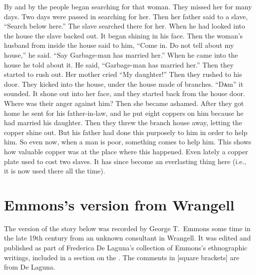 By and by the people began searching for that woman.
They missed her for many days.
Two days were passed in searching for her.
Then her father said to a slave,
\qqk{}“Search below here.”
The slave searched there for her.
When he had looked into the house the slave backed out.
It began shining in his face.
Then the woman’s husband from inside the house said to him,
\qqk{}“Come in. Do not tell about my house,”
he said.
\qqk{}“Say Garbage-man has married her.”
When he came into the house he told about it.
He said, “Garbage-man has married her.”
Then they started to rush out.
Her mother cried “My daughter!”
Then they rushed to his door.
They kicked into the house, under the house made of branches.
\qqk{}“Dᴀm” it sounded.
It shone out into her face,
and they started back from the house door.
Where was their anger against him?
Then she became ashamed.
After they got home he sent for his father-in-law,
and he put eight coppers on him because he had married his daughter.
Then they threw the branch house away,
letting the copper shine out.
But his father had done this purposely to him in order to help him.
So even now, when a man is poor, something comes to help him.
This shows how valuable copper was at the place where this happened.
Even lately a copper plate used to cost two slaves.
It has since become an everlasting thing here (i.e., it is now used there all the time).

\section{Emmons’s version from Wrangell}\label{sec:89-emmons-version}

The version of the story below was recorded by George T.\ Emmons some time in the late 19th century from an unknown consultant in Wrangell.
It was edited and published as part of Frederica De Laguna’s collection of Emmons’s ethnographic writings, included in a section on the  \parencite[180]{emmons:1991}.
The comments in [square brackets] are from De Laguna.

